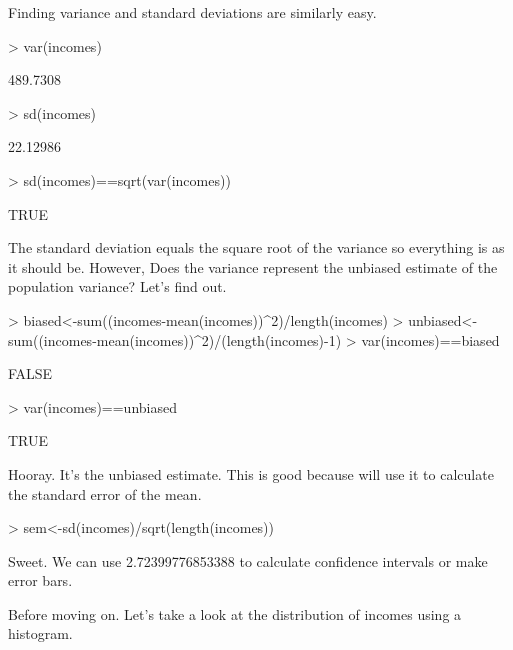\documentclass[12pt]{article}
\begin{document}
Finding variance and standard deviations are similarly easy.

\begin{Schunk}
\begin{Sinput}
> var(incomes)
\end{Sinput}
\begin{Soutput}
[1] 489.7308
\end{Soutput}
\begin{Sinput}
> sd(incomes)
\end{Sinput}
\begin{Soutput}
[1] 22.12986
\end{Soutput}
\begin{Sinput}
> sd(incomes)==sqrt(var(incomes))
\end{Sinput}
\begin{Soutput}
[1] TRUE
\end{Soutput}
\end{Schunk}

The standard deviation equals the square root of the variance so everything is as it
should be. However, Does the variance represent the unbiased estimate of the population
variance? Let's find out.

\begin{Schunk}
\begin{Sinput}
> biased<-sum((incomes-mean(incomes))^2)/length(incomes)
> unbiased<-sum((incomes-mean(incomes))^2)/(length(incomes)-1)
> var(incomes)==biased
\end{Sinput}
\begin{Soutput}
[1] FALSE
\end{Soutput}
\begin{Sinput}
> var(incomes)==unbiased
\end{Sinput}
\begin{Soutput}
[1] TRUE
\end{Soutput}
\end{Schunk}

Hooray. It's the unbiased estimate. This is good because will use it to calculate
the standard error of the mean.

\begin{Schunk}
\begin{Sinput}
> sem<-sd(incomes)/sqrt(length(incomes))
\end{Sinput}
\end{Schunk}

Sweet. We can use 2.72399776853388 to calculate confidence intervals or make error bars.

Before moving on. Let's take a look at the distribution of incomes using a histogram.
\end{document}
